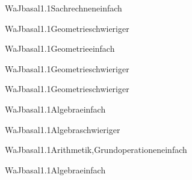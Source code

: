 \documentclass[12pt]{article}
\begin{document}
\begin{Add}{WaJ}{basal1.1}{Sachrechnen}{einfach}
\end{Add}

\begin{Add}{WaJ}{basal1.1}{Geometrie}{schwieriger}
\end{Add}

\begin{Add}{WaJ}{basal1.1}{Geometrie}{einfach}
\end{Add}

\begin{Add}{WaJ}{basal1.1}{Geometrie}{schwieriger}
\end{Add}

\begin{Add}{WaJ}{basal1.1}{Geometrie}{schwieriger}
\end{Add}

\begin{Add}{WaJ}{basal1.1}{Algebra}{einfach}
\end{Add}

\begin{Add}{WaJ}{basal1.1}{Algebra}{schwieriger}
\end{Add}

\begin{Add}{WaJ}{basal1.1}{Arithmetik,Grundoperationen}{einfach}
\end{Add}

\begin{Add}{WaJ}{basal1.1}{Algebra}{einfach}
\end{Add}
\end{document}
